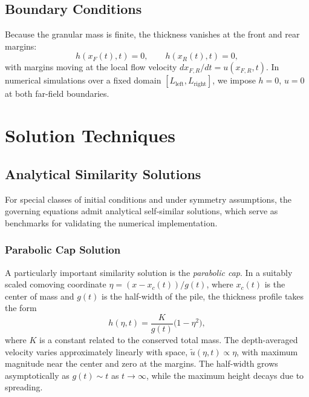\documentclass[10pt, conference]{FMFP2023}
\begin{document}
\subsection{Boundary Conditions}

Because the granular mass is finite, the thickness vanishes at the
front and rear margins:
\begin{equation}
    h(x_F(t),t) = 0, \qquad h(x_R(t),t) = 0,
\end{equation}
with margins moving at the local flow velocity
$dx_{F,R}/dt = u(x_{F,R},t)$.
In numerical simulations over a fixed domain $[L_{\text{left}},
L_{\text{right}}]$, we impose $h=0$, $u=0$ at both far-field
boundaries.

\section{Solution Techniques}

\subsection{Analytical Similarity Solutions}

For special classes of initial conditions and under symmetry
assumptions, the governing equations admit analytical self-similar
solutions, which serve as benchmarks for validating the numerical
implementation.

\subsubsection{Parabolic Cap Solution}

A particularly important similarity solution is the
\emph{parabolic cap}.
In a suitably scaled comoving coordinate
$\eta = (x - x_c(t))/g(t)$, where $x_c(t)$ is the center of mass
and $g(t)$ is the half-width of the pile, the thickness profile takes
the form
\begin{equation}
    h(\eta,t) = \frac{K}{g(t)}\bigl(1-\eta^2\bigr),
    \label{eq:parabolic-cap}
\end{equation}
where $K$ is a constant related to the conserved total mass.
The depth-averaged velocity varies approximately linearly with space,
$\tilde{u}(\eta,t)\propto\eta$, with maximum magnitude near the center
and zero at the margins.
The half-width grows asymptotically as $g(t)\sim t$ as $t\to\infty$,
while the maximum height decays due to spreading.
\end{document}

